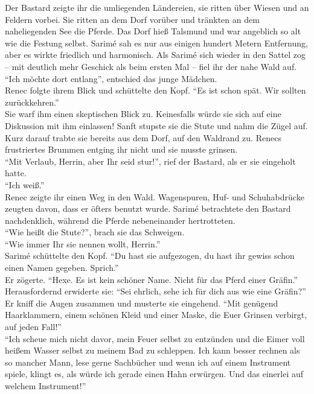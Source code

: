 Der Bastard zeigte ihr die umliegenden Ländereien, sie ritten über Wiesen und an Feldern vorbei. 
Sie ritten an dem Dorf vorüber und tränkten an dem naheliegenden See die Pferde. Das Dorf hieß 
Talsmund und war angeblich so alt wie die Festung selbst. Sarimé sah es nur aus einigen hundert 
Metern Entfernung, aber es wirkte friedlich und harmonisch. Als Sarimé sich wieder in den Sattel 
zog – mit deutlich mehr Geschick als beim ersten Mal – fiel ihr der nahe Wald auf. ``Ich möchte 
dort entlang'', entschied das junge Mädchen.\\
Renec folgte ihrem Blick und schüttelte den Kopf. ``Es ist schon spät. Wir sollten zurückkehren.''\\
Sie warf ihm einen skeptischen Blick zu. Keinesfalls würde sie sich auf eine Diskussion mit ihm 
einlassen! Sanft stupste sie die Stute und nahm die Zügel auf. Kurz darauf trabte sie bereits aus 
dem Dorf, auf den Waldrand zu. Renecs frustriertes Brummen entging ihr nicht und sie musste 
grinsen.\\
``Mit Verlaub, Herrin, aber Ihr seid stur!'', rief der Bastard, als er sie eingeholt hatte.\\
``Ich weiß.''\\
Renec zeigte ihr einen Weg in den Wald. Wagenspuren, Huf- und Schuhabdrücke zeugten davon, dass er 
öfters benutzt wurde. Sarimé betrachtete den Bastard nachdenklich, während die Pferde nebeneinander 
hertrotteten.\\
``Wie heißt die Stute?'', brach sie das Schweigen.\\
``Wie immer Ihr sie nennen wollt, Herrin.''\\
Sarimé schüttelte den Kopf. ``Du hast sie aufgezogen, du hast ihr gewiss schon einen Namen gegeben. 
Sprich.''\\
Er zögerte. ``Hexe. Es ist kein schöner Name. Nicht für das Pferd einer Gräfin.''\\
Herausfordernd erwiderte sie: ``Sei ehrlich, sehe ich für dich aus wie eine Gräfin?''\\
Er kniff die Augen zusammen und musterte sie eingehend. ``Mit genügend Haarklammern, einem schönen 
Kleid und einer Maske, die Euer Grinsen verbirgt, auf jeden Fall!''\\
``Ich scheue mich nicht davor, mein Feuer selbst zu entzünden und die Eimer voll heißem Wasser 
selbst zu meinem Bad zu schleppen. Ich kann besser rechnen als so mancher Mann, lese gerne 
Sachbücher und wenn ich auf einem Instrument spiele, klingt es, als würde ich gerade einen Hahn 
erwürgen. Und das einerlei auf welchem Instrument!''\\
